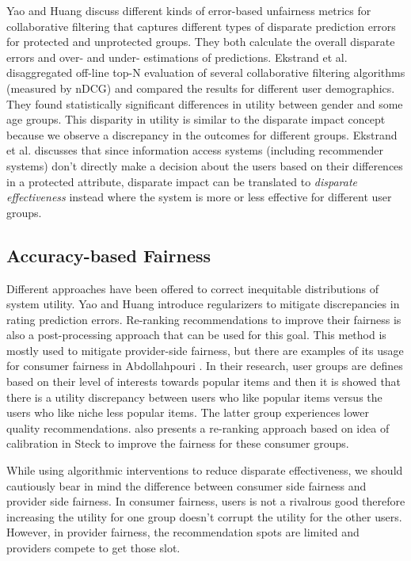     Yao and Huang \cite{yao_huang_fatml-2017} discuss different kinds of error-based unfairness metrics for collaborative filtering that captures different types of disparate prediction errors for protected and unprotected groups. They both calculate the overall disparate errors and over- and under- estimations of predictions. Ekstrand et al. \cite{ekstrand2018all} disaggregated off-line top-N evaluation of several collaborative filtering algorithms (measured by nDCG) and compared the results for different user demographics. They found statistically significant differences in utility between gender and some age groups. This disparity in utility is similar to the disparate impact concept because we observe a discrepancy in the outcomes for different groups. Ekstrand et al. \cite{ekstrand2021fairness} discusses that since information access systems (including recommender systems) don't directly make a decision about the users based on their differences in a protected attribute, disparate impact can be translated to \textit{disparate effectiveness} instead where the system is more or less effective for different user groups. 
    
    \subsection{Accuracy-based Fairness}
    Different approaches have been offered to correct inequitable distributions of system utility. Yao and Huang \cite{yao2017beyond} introduce regularizers to mitigate discrepancies in rating prediction errors. Re-ranking recommendations to improve their fairness is also a post-processing approach that can be used for this goal. This method is mostly used to mitigate provider-side fairness, but there are examples of its usage for consumer fairness in Abdollahpouri \cite{abdollahpouri2020popularity}. In their research, user groups are defines based on their level of interests towards popular items and then it is showed that there is a utility discrepancy between users who like popular items versus the users who like niche less popular items. The latter group experiences lower quality recommendations. \cite{abdollahpuri20} also presents a re-ranking approach based on idea of calibration in Steck \cite{steck2018calibrated} to improve the fairness for these consumer groups.
    
    While using algorithmic interventions to reduce disparate effectiveness, we should cautiously bear in mind the difference between consumer side fairness and provider side fairness. In consumer fairness, users is not a rivalrous good therefore increasing the utility for one group doesn't corrupt the utility for the other users. However, in provider fairness, the recommendation spots are limited and providers compete to get those slot. 
    
